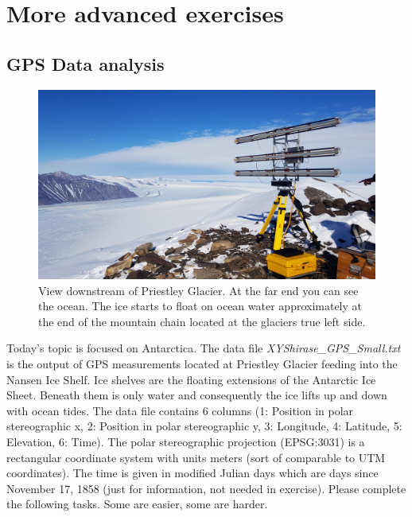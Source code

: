 \section{More advanced exercises}
\subsection{GPS Data analysis}
\begin{figure}
\begin{center}
\includegraphics[width=15cm]{Figures/20181031_140359.jpg}
\caption{View downstream of Priestley Glacier. At the far end you can see the ocean. The ice starts to float on ocean water approximately at the end of the mountain chain located at the glaciers true left side.}
\end{center}
\end{figure}
Today's topic is focused on Antarctica. The data file \textit{XYShirase\_GPS\_Small.txt} is the output of GPS measurements located at Priestley Glacier feeding into the Nansen Ice Shelf. Ice shelves are the floating extensions of the Antarctic Ice Sheet. Beneath them is only water and consequently the ice lifts up and down with ocean tides. The data file contains 6 columns (1: Position in polar stereographic x, 2: Position in polar stereographic y, 3: Longitude, 4: Latitude, 5: Elevation, 6: Time). The polar stereographic projection (EPSG:3031) is a rectangular coordinate system with units meters (sort of comparable to UTM coordinates). The time is given in modified Julian days which are days since November 17, 1858 (just for information, not needed in exercise). Please complete the following tasks. Some are easier, some are harder.

